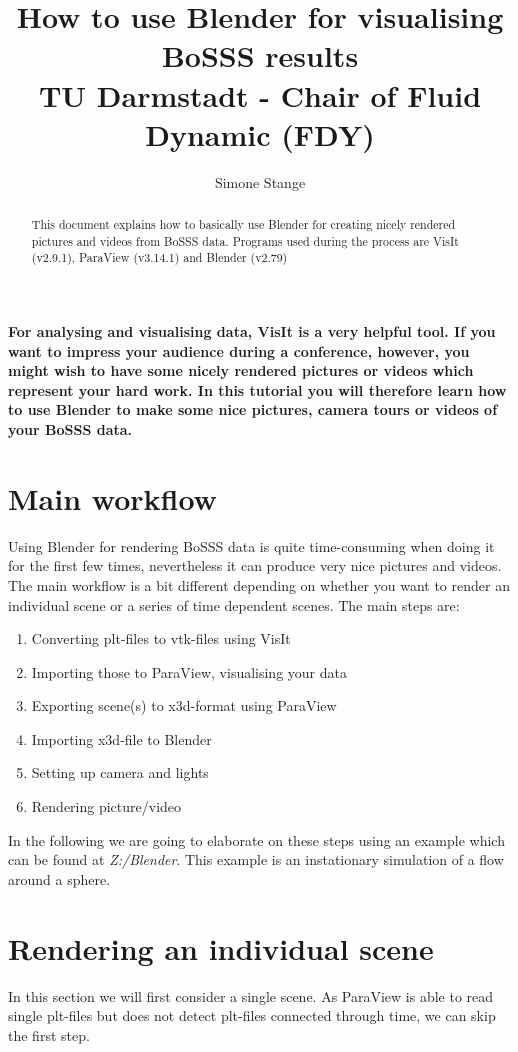 \documentclass[11pt,twoside,a4paper]{fdyartcl}
\title{How to use Blender for visualising BoSSS results\\TU Darmstadt - Chair of Fluid Dynamic (FDY)}
\author{Simone Stange}
\theoremstyle{myPlain}
\theoremstyle{myDefinition}
\begin{document}


\maketitle


\begin{abstract}
This document explains how to basically use Blender for creating nicely rendered pictures and videos from BoSSS data. Programs used during the process are VisIt (v2.9.1), ParaView (v3.14.1) and Blender (v2.79)
\end{abstract}


\textbf{For analysing and visualising data, VisIt is a very helpful tool. If you want to impress your audience during a conference, however, you might wish to have some nicely rendered pictures or videos which represent your hard work. In this tutorial you will therefore learn how to use Blender to make some nice pictures, camera tours or videos of your BoSSS data.}

\section{Main workflow}
Using Blender for rendering BoSSS data is quite time-consuming when doing it for the first few times, nevertheless it can produce very nice pictures and videos. The main workflow is a bit different depending on whether you want to render an individual scene or a series of time dependent scenes. 
The main steps are:
\begin{enumerate}
	\item Converting plt-files to vtk-files using VisIt
	\item Importing those to ParaView, visualising your data
	\item Exporting scene(s) to x3d-format using ParaView
	\item Importing x3d-file to Blender
	\item Setting up camera and lights
	\item Rendering picture/video 
\end{enumerate}
In the following we are going to elaborate on these steps using an example which can be found at \textit{Z:/Blender}. This example is an instationary simulation of a flow around a sphere.

\section{Rendering an individual scene}
In this section we will first consider a single scene. As ParaView is able to read single plt-files but does not detect plt-files connected through time, we can skip the first step.
\end{document}
